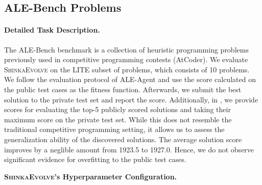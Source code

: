 \documentclass[11pt, a4paper]{include/gdm_format}
\newcommand{\ouralgo}{\textsc{ShinkaEvolve}\xspace}
\begin{document}
{\clearpage
\subsection{ALE-Bench Problems}

\paragraph{Detailed Task Description.} The ALE-Bench benchmark \citep{imajuku2025ale} is a collection of heuristic programming problems previously used in competitive programming contests (AtCoder). We evaluate \ouralgo on the LITE subset of problems, which consists of 10 problems. We follow the evaluation protocol of ALE-Agent \citep{imajuku2025ale} and use the score calculated on the public test cases as the fitness function. Afterwards, we submit the best solution to the private test set and report the score. Additionally, in , we provide scores for evaluating the top-5 publicly scored solutions and taking their maximum score on the private test set. While this does not resemble the traditional competitive programming setting, it allows us to assess the generalization ability of the discovered solutions. The average solution score improves by a neglible amount from 1923.5 to 1927.0. Hence, we do not observe significant evidence for overfitting to the public test cases.

\textbf{\ouralgo's Hyperparameter Configuration.}

}
\end{document}
